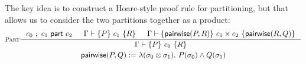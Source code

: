 \documentclass[p.tex]{subfiles}
\begin{document}
The key idea is to construct a Hoare-style proof rule for
partitioning, but that allows us to consider the two partitions
together as a product:
\begin{gather*}
  \inference[$\textsc{Part}$]{%
    \relpart{c_0}{c_1}{c_2}&
    \judgement{\Gamma}{P}{c_1}{R}&
    \judgement{\Gamma}{\pairwise(P,R)}{c_1 \times c_2}{\pairwise(R,Q)}
  }{%
    \judgement{\Gamma}{P}{c_0}{R}
  }
  \\
  \textsf{pairwise}(P, Q) := \lambda(\sprod{\sigma_0}{\sigma_1}).~P(\sigma_0) \land Q(\sigma_1)
\end{gather*}
\end{document}
